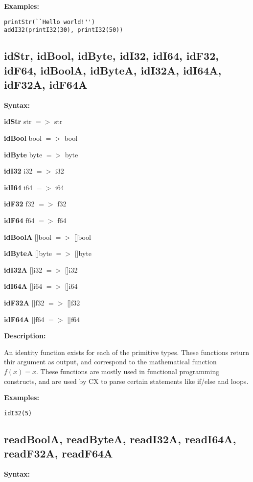 \textbf{Examples:}

\begin{lstlisting}
printStr(``Hello world!'')
addI32(printI32(30), printI32(50))
\end{lstlisting}

\subsection{idStr, idBool, idByte, idI32, idI64, idF32,
  idF64, idBoolA, idByteA, idI32A, idI64A, idF32A, idF64A}

\textbf{Syntax:}

\textbf{idStr} str $=>$ str

\textbf{idBool} bool $=>$ bool

\textbf{idByte} byte $=>$ byte

\textbf{idI32} i32 $=>$ i32

\textbf{idI64} i64 $=>$ i64

\textbf{idF32} f32 $=>$ f32

\textbf{idF64} f64 $=>$ f64

\textbf{idBoolA} []bool $=>$ []bool

\textbf{idByteA} []byte $=>$ []byte

\textbf{idI32A} []i32 $=>$ []i32

\textbf{idI64A} []i64 $=>$ []i64

\textbf{idF32A} []f32 $=>$ []f32

\textbf{idF64A} []f64 $=>$ []f64

\textbf{Description:}

An identity function exists for each of the primitive types. These
functions return thir argument as output, and correspond to the
mathematical function $f(x) = x$. These functions are mostly used in
functional programming constructs, and are used by CX to parse certain
statements like if/else and loops.

\textbf{Examples:}

\begin{lstlisting}
idI32(5)
\end{lstlisting}





\subsection{readBoolA, readByteA, readI32A, readI64A, readF32A, readF64A}

\textbf{Syntax:}

